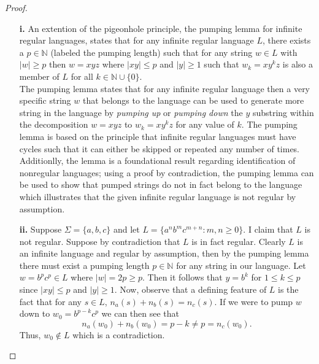 \documentclass[ 12pt ]{article}
\begin{document}
\begin{enumerate}
		\begin{proof}
			\begin{enumerate}
				\item[\textbf{i.}] An extention of the pigeonhole principle, the pumping lemma for infinite regular languages, states that for any infinite regular language $L$, there
					exists a $p \in \mathbb{N}$ (labeled the pumping length) such that for any string $w \in L$ with $|w| \geq p$ then $w = xyz$ where $|xy| \leq p$ and $|y| \geq 1$ such
					that $w_k = xy^kz$ is also a member of $L$ for all $k \in \mathbb{N} \cup \{ 0 \}$. \\
					The pumping lemma states that for any infinite regular language then a very specific string $w$ that belongs to the language can be used to generate more string in
					the language by \textit{pumping up} or \textit{pumping down} the $y$ substring within the decomposition $w = xyz$ to $w_k = xy^kz$ for any value of $k$. The pumping
					lemma is based on the principle that infinite regular languages must have cycles such that it can either be skipped or repeated any number of times. Additionlly,
					the lemma is a foundational result regarding identification of nonregular languages; using a proof by contradiction, the pumping lemma can be used to show that pumped
					strings do not in fact belong to the language which illustrates that the given infinite regular language is not regular by assumption.

				\item[\textbf{ii.}] Suppose $\Sigma = \{ a, b, c \}$ and let $L = \{ a^n b^m c^{m + n} : m, n \geq 0 \}$. I claim that $L$ is not regular. Suppose by contradiction that
					$L$ is in fact regular. Clearly $L$ is an infinite language and regular by assumption, then by the pumping lemma there must exist a pumping length $p \in \mathbb{N}$
					for any string in our language. Let $w = b^p c^p \in L$ where $|w| = 2p \geq p$. Then it follows that $y = b^k$ for $1 \leq k \leq p$ since $|xy| \leq p$ and $|y|
					\geq 1$. Now, observe that a defining feature of $L$ is the fact that for any $s \in L$, $n_a(s) + n_b(s) = n_c(s)$. If we were to pump $w$ down to $w_0 = b^{p - k}
					c^p$ we can then see that $$n_a(w_0) + n_b(w_0) = p - k \neq p = n_c(w_0).$$ Thus, $w_0 \notin L$ which is a contradiction.
			\end{enumerate}
		\end{proof}

\end{enumerate}
\end{document}
